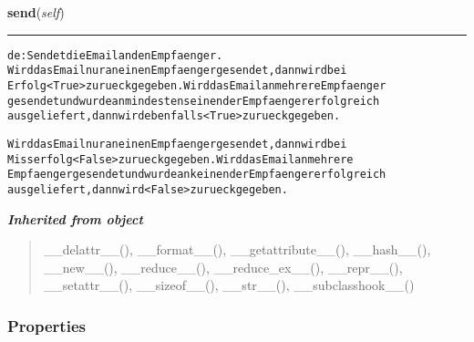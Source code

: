     \label{cuon:simplemail:Email:send}

    \vspace{0.5ex}

\hspace{.8\funcindent}\begin{boxedminipage}{\funcwidth}

    \raggedright \textbf{send}(\textit{self})

    \vspace{-1.5ex}

    \rule{\textwidth}{0.5\fboxrule}
\setlength{\parskip}{2ex}
\begin{alltt}

de: Sendet die Email an den Empfaenger.
    Wird das Email nur an einen Empfaenger gesendet, dann wird bei
    Erfolg {\textless}True{\textgreater} zurueck gegeben. Wird das Email an mehrere Empfaenger
    gesendet und wurde an mindestens einen der Empfaenger erfolgreich
    ausgeliefert, dann wird ebenfalls {\textless}True{\textgreater} zurueck gegeben.
    
    Wird das Email nur an einen Empfaenger gesendet, dann wird bei
    Misserfolg {\textless}False{\textgreater} zurueck gegeben. Wird das Email an mehrere 
    Empfaenger gesendet und wurde an keinen der Empfaenger erfolgreich
    ausgeliefert, dann wird {\textless}False{\textgreater} zurueck gegeben.
\end{alltt}

\setlength{\parskip}{1ex}
    \end{boxedminipage}


\large{\textbf{\textit{Inherited from object}}}

\begin{quote}
\_\_delattr\_\_(), \_\_format\_\_(), \_\_getattribute\_\_(), \_\_hash\_\_(), \_\_new\_\_(), \_\_reduce\_\_(), \_\_reduce\_ex\_\_(), \_\_repr\_\_(), \_\_setattr\_\_(), \_\_sizeof\_\_(), \_\_str\_\_(), \_\_subclasshook\_\_()
\end{quote}


  \subsubsection{Properties}


